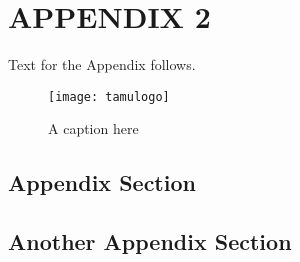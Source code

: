 %
%	 
%


\chapter{APPENDIX 2}

Text for the Appendix follows.

\begin{figure}[ht]
    \centering
    \texttt{[image: tamulogo]}
    \caption{A caption here}
\end{figure}

\section{Appendix Section}

\section{Another Appendix Section}


\pagebreak{}
